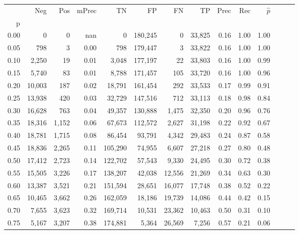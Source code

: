 \begin{tabular}{rrrrrrrrrrrrrr}
\toprule
{} &     Neg &    Pos & mPrec &       TN &       FP &      FN &      TP &  Prec &   Rec & $\hat{p}$ \\
p    &         &        &       &          &          &         &         &       &       &           \\
\midrule
0.00 &       0 &      0 &   nan &        0 &  180,245 &       0 &  33,825 &  0.16 &  1.00 &      1.00 \\
0.05 &     798 &      3 &  0.00 &      798 &  179,447 &       3 &  33,822 &  0.16 &  1.00 &      1.00 \\
0.10 &   2,250 &     19 &  0.01 &    3,048 &  177,197 &      22 &  33,803 &  0.16 &  1.00 &      0.99 \\
0.15 &   5,740 &     83 &  0.01 &    8,788 &  171,457 &     105 &  33,720 &  0.16 &  1.00 &      0.96 \\
0.20 &  10,003 &    187 &  0.02 &   18,791 &  161,454 &     292 &  33,533 &  0.17 &  0.99 &      0.91 \\
0.25 &  13,938 &    420 &  0.03 &   32,729 &  147,516 &     712 &  33,113 &  0.18 &  0.98 &      0.84 \\
0.30 &  16,628 &    763 &  0.04 &   49,357 &  130,888 &   1,475 &  32,350 &  0.20 &  0.96 &      0.76 \\
0.35 &  18,316 &  1,152 &  0.06 &   67,673 &  112,572 &   2,627 &  31,198 &  0.22 &  0.92 &      0.67 \\
0.40 &  18,781 &  1,715 &  0.08 &   86,454 &   93,791 &   4,342 &  29,483 &  0.24 &  0.87 &      0.58 \\
0.45 &  18,836 &  2,265 &  0.11 &  105,290 &   74,955 &   6,607 &  27,218 &  0.27 &  0.80 &      0.48 \\
0.50 &  17,412 &  2,723 &  0.14 &  122,702 &   57,543 &   9,330 &  24,495 &  0.30 &  0.72 &      0.38 \\
0.55 &  15,505 &  3,226 &  0.17 &  138,207 &   42,038 &  12,556 &  21,269 &  0.34 &  0.63 &      0.30 \\
0.60 &  13,387 &  3,521 &  0.21 &  151,594 &   28,651 &  16,077 &  17,748 &  0.38 &  0.52 &      0.22 \\
0.65 &  10,465 &  3,662 &  0.26 &  162,059 &   18,186 &  19,739 &  14,086 &  0.44 &  0.42 &      0.15 \\
0.70 &   7,655 &  3,623 &  0.32 &  169,714 &   10,531 &  23,362 &  10,463 &  0.50 &  0.31 &      0.10 \\
0.75 &   5,167 &  3,207 &  0.38 &  174,881 &    5,364 &  26,569 &   7,256 &  0.57 &  0.21 &      0.06 \\

\end{tabular}
